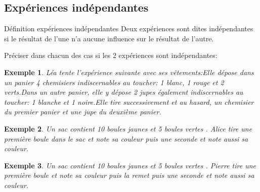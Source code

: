 \documentclass[10pt,a4paper]{article}
\theoremstyle{break}
\newtheorem{Ex}{Exemple}
\begin{document}
	\subsection{Expériences indépendantes}
		\begin{bclogo}[couleur = yellow!30,arrondi =0.1,logo =\bcbook]{Définition expériences indépendantes} 
			Deux expériences sont dites indépendantes si le résultat de l’une n’a aucune influence sur le résultat de l’autre.
			
			\end{bclogo}
		Préciser dans chacun des cas si les 2 expériences sont indépendantes:
		\begin{Ex}
			Léa tente l’expérience suivante avec ses vêtements:Elle dépose dans un panier 4 chemisiers indiscernables au toucher: 1 blanc, 1 rouge et 2 verts.Dans un autre panier, elle y dépose 2 jupes également indiscernables au toucher: 1 blanche et 1 noire.Elle tire successivement et au hasard, un chemisier du premier panier et une jupe du deuxième panier.	
		\end{Ex}
	\begin{Ex}
		Un sac contient 10 boules jaunes et 5 boules vertes . Alice tire une première boule dans le sac  et note sa couleur puis une seconde et note aussi sa couleur.
	\end{Ex}
	\begin{Ex}
	Un sac contient 10 boules jaunes et 5 boules vertes . Pierre tire une première boule et note sa couleur puis la remet puis une seconde et note aussi sa couleur.
\end{Ex}
\end{document}
